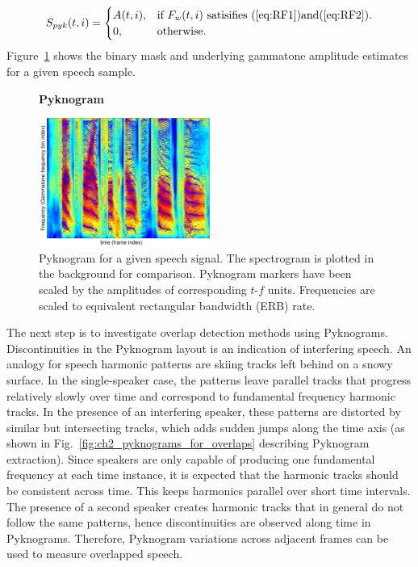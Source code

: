 {\begin{equation}
S_{pyk}(t,i)=\begin{cases}
A(t,i), & \text{if $F_w(t,i)$ satisifies (\ref{eq:RF1})and(\ref{eq:RF2})}.\\
0, & \text{otherwise}.
\end{cases}
\end{equation}
Figure~\ref{fig:ch2_pyknograms} shows the binary mask and underlying gammatone amplitude estimates for a given speech sample. 

\begin{figure}[h!]
	\centering
	\vspace{4mm}
	\textbf{Pyknogram}\par\medskip
	\includegraphics[height =2.in, width=0.5\textwidth]{figures/pyknogram_vs_spectrogram}
	\vspace{-1mm}
	\caption{ Pyknogram for a given speech signal. The spectrogram is plotted in the background for comparison. Pyknogram markers have been scaled by the amplitudes of corresponding $t$-$f$ units. Frequencies are scaled to equivalent rectangular bandwidth (ERB) rate.}
	\vspace{-1mm}
	\label{fig:ch2_pyknograms}
\end{figure}

The next step is to investigate overlap detection methods using Pyknograms.
Discontinuities in the Pyknogram layout is an indication of interfering speech. 
An analogy for speech harmonic patterns are skiing tracks left behind on a snowy surface. 
In the single-speaker case, the patterns leave parallel tracks that progress relatively slowly over time and correspond to fundamental frequency harmonic tracks. 
In the presence of an interfering speaker, these patterns are distorted by similar but intersecting tracks, which adds sudden jumps along the time axis (as shown in Fig.~\ref{fig:ch2_pyknograms_for_overlaps} describing Pyknogram extraction). 
Since speakers are only capable of producing one fundamental frequency at each time instance, it is expected that the harmonic tracks should be consistent across time. 
This keeps harmonics parallel over short time intervals.   
The presence of a second speaker creates harmonic tracks that in general do not follow the same patterns, hence discontinuities are observed along time in Pyknograms. Therefore, Pyknogram variations across adjacent frames can be used to measure overlapped speech.

}
